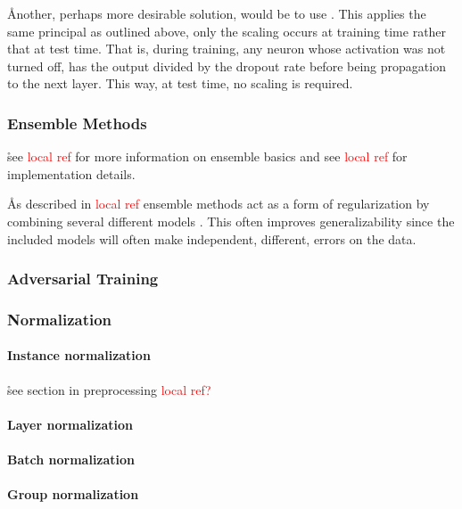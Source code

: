 \r{Another, perhaps more desirable solution, would be to use . This applies the same principal as outlined above, only the scaling occurs at training time rather that at test time. That is, during training, any neuron whose activation was not turned off, has the output divided by the dropout rate before being propagation to the next layer.  This way, at test time, no scaling is required.}


\subsubsection{Ensemble Methods}

\r{see \textcolor{red}{local ref} for more information on ensemble basics and see \textcolor{red}{local ref} for implementation details.}

\r{As described in \textcolor{red}{local ref} ensemble methods act as a form of regularization by combining several different models . This often improves generalizability since the included models will often make independent, different, errors on the data.}

\subsubsection{Adversarial Training}

\subsubsection{Normalization}



\paragraph{Instance normalization}

\r{see section in preprocessing \textcolor{red}{local ref?}}

\paragraph{Layer normalization}

\paragraph{Batch normalization}

\paragraph{Group normalization}